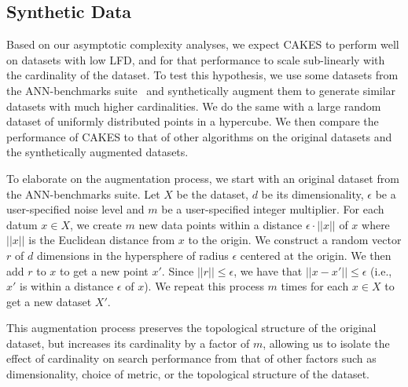 \subsection{Synthetic Data}
\label{subsec:methods:synthetic-data}

Based on our asymptotic complexity analyses, we expect CAKES to perform well on datasets with low LFD, and for that performance to scale sub-linearly with the cardinality of the dataset.
To test this hypothesis, we use some datasets from the ANN-benchmarks suite~\cite{aumuller2020ann} and synthetically augment them to generate similar datasets with much higher cardinalities.
We do the same with a large random dataset of uniformly distributed points in a hypercube.
We then compare the performance of CAKES to that of other algorithms on the original datasets and the synthetically augmented datasets.

To elaborate on the augmentation process, we start with an original dataset from the ANN-benchmarks suite.
Let $X$ be the dataset, $d$ be its dimensionality, $\epsilon$ be a user-specified noise level and $m$ be a user-specified integer multiplier.
For each datum $x \in X$, we create $m$ new data points within a distance $\epsilon \cdot ||x||$ of $x$ where $||x||$ is the Euclidean distance from $x$ to the origin.
We construct a random vector $r$ of $d$ dimensions in the hypersphere of radius $\epsilon$ centered at the origin.
We then add $r$ to $x$ to get a new point $x'$.
Since $||r|| \leq \epsilon$, we have that $||x - x'|| \leq \epsilon$ (i.e., $x'$ is within a distance $\epsilon$ of $x$).
We repeat this process $m$ times for each $x \in X$ to get a new dataset $X'$.

This augmentation process preserves the topological structure of the original dataset, but increases its cardinality by a factor of $m$, allowing us to isolate the effect of cardinality on search performance from that of other factors such as dimensionality, choice of metric, or the topological structure of the dataset.
